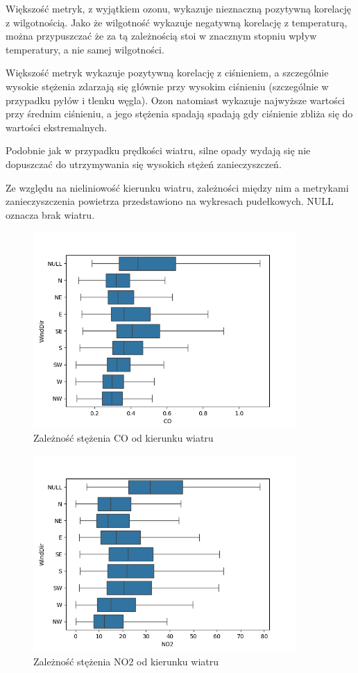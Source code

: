 \documentclass[18pt, letterpaper]{article}
\begin{document}
Większość metryk, z wyjątkiem ozonu, wykazuje nieznaczną pozytywną korelację z wilgotnością. Jako że wilgotność wykazuje negatywną korelację z temperaturą, można przypuszczać że za tą zależnością stoi w znacznym stopniu wpływ temperatury, a nie samej wilgotności.

Większość metryk wykazuje pozytywną korelację z ciśnieniem, a szczególnie wysokie stężenia zdarzają się głównie przy wysokim ciśnieniu (szczególnie w przypadku pyłów i tlenku węgla). Ozon natomiast wykazuje najwyższe wartości przy średnim ciśnieniu, a jego stężenia spadają spadają gdy ciśnienie zbliża się do wartości ekstremalnych.

Podobnie jak w przypadku prędkości wiatru, silne opady wydają się nie dopuszczać do utrzymywania się wysokich stężeń zanieczyszczeń.

Ze względu na nieliniowość kierunku wiatru, zależności między nim a metrykami zanieczyszczenia powietrza przedstawiono na wykresach pudełkowych. NULL oznacza brak wiatru.

\begin{figure}[H]
\centering
\includegraphics[width=100mm, height=75mm]{visualisations/wind_dir_pollution_patterns/wind_dir_CO.png}
\caption{Zależność stężenia CO od kierunku wiatru}
\end{figure}

\begin{figure}[H]
\centering
\includegraphics[width=100mm, height=75mm]{visualisations/wind_dir_pollution_patterns/wind_dir_NO2.png}
\caption{Zależność stężenia NO2 od kierunku wiatru}
\end{figure}
\end{document}
